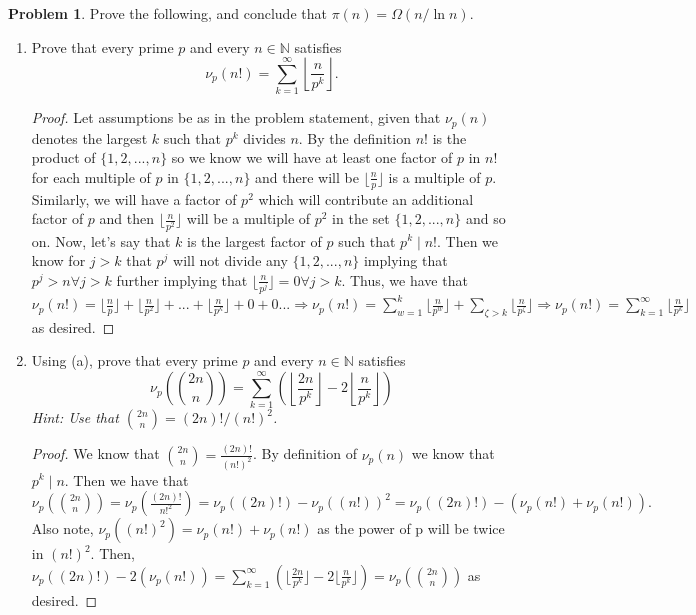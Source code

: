 \documentclass[11pt, letter]{amsart}
\theoremstyle{definition}
\newtheorem{problem}{Problem}[]
\begin{document}
\begin{problem}
Prove the following, and conclude that $\pi(n) = \Omega(n / \ln n)$.
  \begin{enumerate}[label={(\alph*)}]
  \item Prove that every prime $p$ and every $n \in \mathbb N$ satisfies
    \begin{equation*}
      \nu_p(n!) = \sum_{k=1}^\infty \left\lfloor \frac{n}{p^k}\right\rfloor.
    \end{equation*}
    \begin{proof}
        Let assumptions be as in the problem statement, given that $\nu_p(n)$ denotes the largest $k$ such that $p^k$ divides $n$. By the definition $n!$ is the product of $\{1, 2, ..., n\}$ so we know we will have at least one factor of $p$ in $n!$ for each multiple of $p$ in $\{1, 2, ..., n\}$ and there will be $\lfloor \frac{n}{p} \rfloor$ is a multiple of $p$. Similarly, we will have a factor of $p^2$ which will contribute an additional factor of $p$ and then $\lfloor \frac{n}{p^2}\rfloor$ will be a multiple of $p^2$ in the set $\{1, 2, ..., n\}$ and so on. Now, let's say that $k$ is the largest factor of $p$ such that $p^k \mid n!$. Then we know for $j > k$ that $p^j$ will not divide any $\{1, 2, ..., n\}$ implying that $p^j > n \forall j > k$ further implying that $\lfloor \frac{n}{p^j} \rfloor = 0 \forall j > k$. Thus, we have that $\nu_p(n!) = \lfloor \frac{n}{p} \rfloor + \lfloor \frac{n}{p^2} \rfloor + ... + \lfloor \frac{n}{p^k} \rfloor + 0 + 0 ... \Rightarrow \nu_p(n!) = \sum_{w = 1}^k \lfloor \frac{n}{p^w} \rfloor + \sum_{\zeta > k} \lfloor \frac{n}{p^\zeta} \rfloor \Rightarrow \nu_p(n!) = \sum_{k = 1}^\infty \lfloor \frac{n}{p^k} \rfloor$ as desired.
    \end{proof}
  \item Using (a), prove that every prime $p$ and every $n \in \mathbb N$ satisfies
    \begin{equation*}
      \nu_p\left(\binom{2n}{n}\right) = \sum_{k=1}^\infty\left(\left\lfloor\frac{2n}{p^k}\right\rfloor  - 2\left\lfloor \frac{n}{p^k}\right\rfloor \right)
    \end{equation*}
    \textit{Hint: Use that $\binom{2n}{n} = (2n)! / (n!)^2$.}
    \begin{proof}
        We know that $\binom{2n}{n} = \frac{(2n)!}{(n!)^2}$. By definition of $\nu_p(n)$ we know that $p^k \mid n$. Then we have that $\nu_p(\binom{2n}{n}) = \nu_p(\frac{(2n)!}{n!^2}) = \nu_p((2n)!) - \nu_p((n!))^2 = \nu_p((2n)!) - (\nu_p(n!) + \nu_p(n!)).$ Also note, $\nu_p((n!)^2) = \nu_p(n!) + \nu_p(n!)$ as the power of p will be twice in $(n!)^2.$ Then, $\nu_p((2n)!) - 2(\nu_p(n!)) = \sum_{k = 1}^\infty (\lfloor \frac{2n}{p^k}\rfloor - 2\lfloor\frac{n}{p^k}\rfloor) = \nu_p(\binom{2n}{n})$ as desired. 

\end{proof}
\end{enumerate}
\end{problem}
\end{document}
